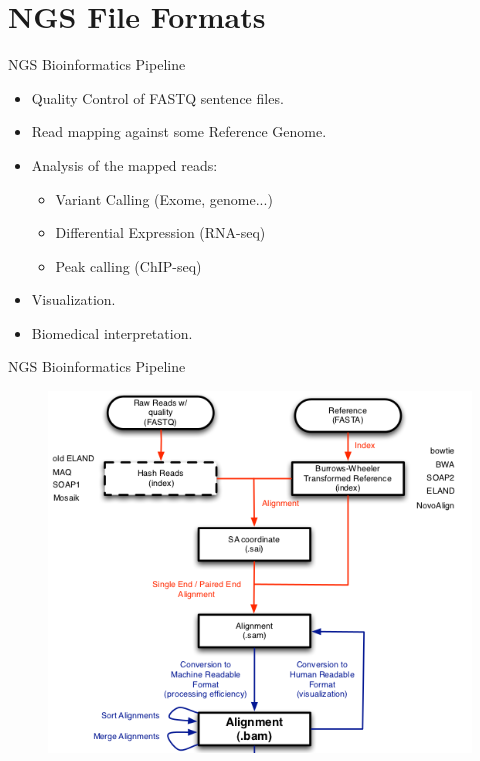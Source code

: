 \documentclass{if-beamer}
\begin{document}
\section{NGS File Formats}
\begin{frame}{NGS Bioinformatics Pipeline}
\begin{large}
\begin{itemize}
    \item Quality Control of FASTQ sentence files.
    \item Read mapping against some Reference Genome.
    \item Analysis of the mapped reads:
    \begin{itemize}
        \item Variant Calling (Exome, genome...)
        \item Differential Expression (RNA-seq)
        \item Peak calling (ChIP-seq)
    \end{itemize}
    \item Visualization.
    \item Biomedical interpretation.
\end{itemize} 
\end{large}
\end{frame}
\begin{frame}{NGS Bioinformatics Pipeline}
\begin{figure}
\centering
\includegraphics[scale=0.6]{ngs_scheme.png}
\end{figure}
\end{frame}
\end{document}
